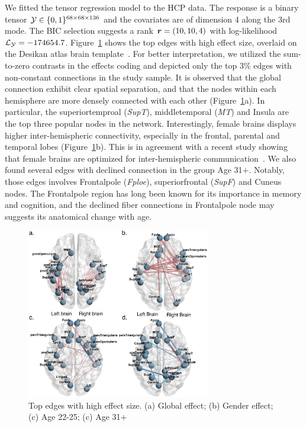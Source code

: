 \documentclass[twoside]{article}
\theoremstyle{plain}
\theoremstyle{definition}
\begin{document}
We fitted the tensor regression model to the HCP data. The response is a binary tensor $\mathcal{Y}\in\{0,1\}^{68\times 68\times 136}$ and the covariates are of dimension 4 along the 3rd mode. The BIC selection suggests a rank $\bm{r}=(10,10,4)$ with log-likelihood $\mathcal{L}_{\mathcal{Y}}=-174654.7$. Figure~\ref{fig:brain} shows the top edges with high effect size, overlaid on the Desikan atlas brain template~\cite{desikan2006automated,xia2013brainnet}. For better interpretation, we utilized the sum-to-zero contrasts in the effects coding and depicted only the top 3\% edges with non-constant connections in the study sample. It is observed that the global connection exhibit clear spatial separation, and that the nodes within each 
hemisphere are more densely connected with each other (Figure~\ref{fig:brain}a). In particular, the superiortemproal (\emph{SupT}), middletemporal (\emph{MT}) and Insula are the top three popular nodes in the network. Interestingly, female brains displays higher inter-hemispheric connectivity, especially in the frontal, parental and temporal lobes (Figure~\ref{fig:brain}b). This is in agreement with a recent study showing that female brains are optimized for inter-hemispheric communication~\cite{ingalhalikar2014sex}. We also found several edges with declined connection in the group Age 31+. Notably, those edges involves Frontalpole (\emph{Fploe}), superiorfrontal (\emph{SupF}) and Cuneus nodes. The Frontalpole region has long been known for its importance in memory and cognition, and the declined fiber connections in Frontalpole node may suggests its anatomical change with age. 
\begin{figure}[t]
\includegraphics[width=8cm]{HCP.pdf}
\caption{Top edges with high effect size. (a) Global effect; (b) Gender effect; (c) Age 22-25; (c) Age 31+}\label{fig:brain}
\end{figure}
\end{document}
